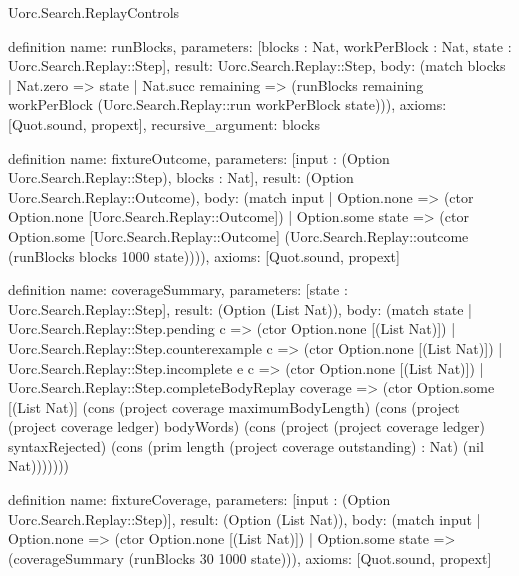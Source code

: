 \begin{lexlean}{Uorc.Search.ReplayControls}
\begin{semanticmodule}
definition{
  name: runBlocks,
  parameters: [blocks : Nat, workPerBlock : Nat, state : Uorc.Search.Replay::Step],
  result: Uorc.Search.Replay::Step,
  body: (match blocks
    | Nat.zero => state
    | Nat.succ remaining => (runBlocks remaining workPerBlock (Uorc.Search.Replay::run workPerBlock state))),
  axioms: [Quot.sound, propext],
  recursive_argument: blocks
}

definition{
  name: fixtureOutcome,
  parameters: [input : (Option Uorc.Search.Replay::Step), blocks : Nat],
  result: (Option Uorc.Search.Replay::Outcome),
  body: (match input
    | Option.none => (ctor Option.none [Uorc.Search.Replay::Outcome])
    | Option.some state => (ctor Option.some [Uorc.Search.Replay::Outcome] (Uorc.Search.Replay::outcome (runBlocks blocks 1000 state)))),
  axioms: [Quot.sound, propext]
}

definition{
  name: coverageSummary,
  parameters: [state : Uorc.Search.Replay::Step],
  result: (Option (List Nat)),
  body: (match state
    | Uorc.Search.Replay::Step.pending c => (ctor Option.none [(List Nat)])
    | Uorc.Search.Replay::Step.counterexample c => (ctor Option.none [(List Nat)])
    | Uorc.Search.Replay::Step.incomplete e c => (ctor Option.none [(List Nat)])
    | Uorc.Search.Replay::Step.completeBodyReplay coverage => (ctor Option.some [(List Nat)] (cons (project coverage maximumBodyLength) (cons (project (project coverage ledger) bodyWords) (cons (project (project coverage ledger) syntaxRejected) (cons (prim length (project coverage outstanding) : Nat) (nil Nat)))))))
}

definition{
  name: fixtureCoverage,
  parameters: [input : (Option Uorc.Search.Replay::Step)],
  result: (Option (List Nat)),
  body: (match input
    | Option.none => (ctor Option.none [(List Nat)])
    | Option.some state => (coverageSummary (runBlocks 30 1000 state))),
  axioms: [Quot.sound, propext]
}


\end{semanticmodule}
\end{lexlean}
